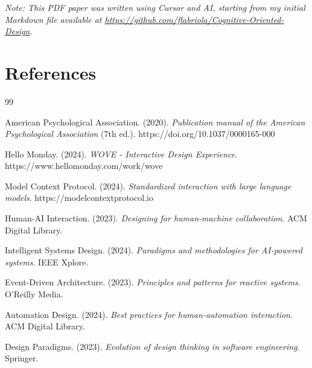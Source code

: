\documentclass[12pt,a4paper]{article}
\begin{document}
\begin{small}
\textit{Note: This PDF paper was written using Cursor and AI, starting from my initial Markdown file available at \url{https://github.com/flabriola/Cognitive-Oriented-Design}.}
\end{small}

\section*{References}

\begin{thebibliography}{99}

 American Psychological Association. (2020). \textit{Publication manual of the American Psychological Association} (7th ed.). https://doi.org/10.1037/0000165-000

 Hello Monday. (2024). \textit{WOVE - Interactive Design Experience}. https://www.hellomonday.com/work/wove

 Model Context Protocol. (2024). \textit{Standardized interaction with large language models}. https://modelcontextprotocol.io

 Human-AI Interaction. (2023). \textit{Designing for human-machine collaboration}. ACM Digital Library.

 Intelligent Systems Design. (2024). \textit{Paradigms and methodologies for AI-powered systems}. IEEE Xplore.

 Event-Driven Architecture. (2023). \textit{Principles and patterns for reactive systems}. O'Reilly Media.

 Automation Design. (2024). \textit{Best practices for human-automation interaction}. ACM Digital Library.

 Design Paradigms. (2023). \textit{Evolution of design thinking in software engineering}. Springer.

\end{thebibliography}
\end{document}
